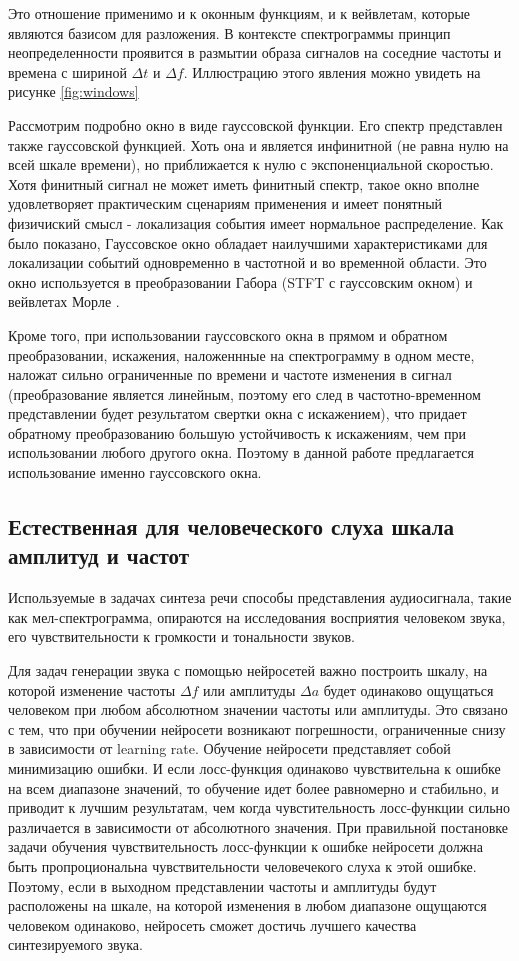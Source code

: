 Это отношение применимо и к оконным функциям, и к вейвлетам, которые являются базисом для разложения. 
В контексте спектрограммы принцип неопределенности проявится в размытии образа сигналов на соседние частоты и времена с шириной $\Delta t$ и $\Delta f$.
Иллюстрацию этого явления можно увидеть на рисунке \ref{fig:windows}

Рассмотрим подробно окно в виде гауссовской функции. Его спектр представлен также гауссовской функцией. Хоть она и является инфинитной (не равна нулю на всей шкале времени),
но приближается к нулю с экспоненциальной скоростью. Хотя финитный сигнал не может иметь финитный спектр, 
такое окно вполне удовлетворяет практическим сценариям применения и имеет понятный физичиский смысл - локализация события имеет нормальное распределение.
Как было показано, Гауссовское окно обладает наилучшими характеристиками для локализации событий одновременно в частотной и во временной области.
Это окно используется в преобразовании Габора \cite{Gabor} (STFT с гауссовским окном) и вейвлетах Морле \cite{MorleWavelet}.

Кроме того, при использовании гауссовского окна в прямом и обратном преобразовании, искажения, наложеннные на спектрограмму в одном месте, наложат сильно ограниченные по времени и частоте изменения в сигнал 
(преобразование является линейным, поэтому его след в частотно-временном представлении будет результатом свертки окна с искажением), 
что придает обратному преобразованию большую устойчивость к искажениям, чем при использовании любого другого окна. 
Поэтому в данной работе предлагается использование именно гауссовского окна.

\subsection{Естественная для человеческого слуха шкала амплитуд и частот}
Используемые в задачах синтеза речи способы представления аудиосигнала, такие как мел-спектрограмма, опираются на исследования восприятия человеком звука, 
его чувствительности к громкости и тональности звуков. 

Для задач генерации звука с помощью нейросетей важно построить шкалу, 
на которой изменение частоты $\Delta f$ или амплитуды $\Delta a$ будет одинаково ощущаться человеком при любом абсолютном значении частоты или амплитуды.
Это связано с тем, что при обучении нейросети возникают погрешности, ограниченные снизу в зависимости от learning rate. 
Обучение нейросети представляет собой минимизацию ошибки. 
И если лосс-функция одинаково чувствительна к ошибке на всем диапазоне значений, то обучение идет более равномерно и стабильно, и приводит к лучшим результатам,
чем когда чувстительность лосс-функции сильно различается в зависимости от абсолютного значения.
При правильной постановке задачи обучения чувствительность лосс-функции к ошибке нейросети должна быть пропроциональна чувствительности человечекого слуха к этой ошибке. 
Поэтому, если в выходном представлении частоты и амплитуды будут расположены на шкале, на которой изменения в любом диапазоне ощущаются человеком одинаково, 
нейросеть сможет достичь лучшего качества синтезируемого звука.

